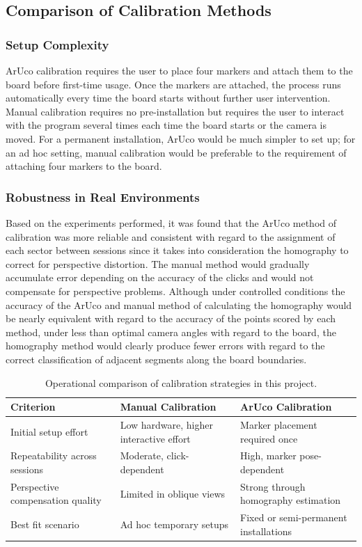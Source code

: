 \subsection{Comparison of Calibration Methods}

\subsubsection{Setup Complexity}
ArUco calibration requires the user to place four markers and attach them to the board before first-time usage. Once the markers are attached, the process runs automatically every time the board starts without further user intervention. Manual calibration requires no pre-installation but requires the user to interact with the program several times each time the board starts or the camera is moved. For a permanent installation, ArUco would be much simpler to set up; for an ad hoc setting, manual calibration would be preferable to the requirement of attaching four markers to the board.

\subsubsection{Robustness in Real Environments}
Based on the experiments performed, it was found that the ArUco method of calibration was more reliable and consistent with regard to the assignment of each sector between sessions since it takes into consideration the homography to correct for perspective distortion. The manual method would gradually accumulate error depending on the accuracy of the clicks and would not compensate for perspective problems. Although under controlled conditions the accuracy of the ArUco and manual method of calculating the homography would be nearly equivalent with regard to the accuracy of the points scored by each method, under less than optimal camera angles with regard to the board, the homography method would clearly produce fewer errors with regard to the correct classification of adjacent segments along the board boundaries.

\vspace{\baselineskip}

\begin{table}[H]
	\centering
	\begin{tabularx}{\linewidth}{@{}X X X@{}}
		\toprule
		\textbf{Criterion} & \textbf{Manual Calibration} & \textbf{ArUco Calibration} \\
		\midrule
		Initial setup effort & Low hardware, higher interactive effort & Marker placement required once \\
		Repeatability across sessions & Moderate, click-dependent & High, marker pose-dependent \\
		Perspective compensation quality & Limited in oblique views & Strong through homography estimation \\
		Best fit scenario & Ad hoc temporary setups & Fixed or semi-permanent installations \\
		\bottomrule
	\end{tabularx}
\caption{Operational comparison of calibration strategies in this project.}
\label{tab:calibration_strategy_comparison}
\end{table}

